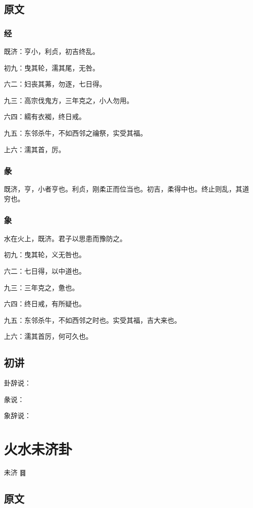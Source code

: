 \documentclass[12pt,oneside]{book}
\begin{document}
\section{原文}

\subsection{经}
既济：亨小，利贞，初吉终乱。

初九：曳其轮，濡其尾，无咎。

六二：妇丧其茀，勿逐，七日得。

九三：高宗伐鬼方，三年克之，小人勿用。

六四：繻有衣袽，终日戒。

九五：东邻杀牛，不如西邻之禴祭，实受其福。

上六：濡其首，厉。

\subsection{彖}
既济，亨，小者亨也。利贞，刚柔正而位当也。初吉，柔得中也。终止则乱，其道穷也。

\subsection{象}
水在火上，既济。君子以思患而豫防之。

初九：曳其轮，义无咎也。

六二：七日得，以中道也。

九三：三年克之，惫也。

六四：终日戒，有所疑也。

九五：东邻杀牛，不如西邻之时也。实受其福，吉大来也。

上六：濡其首厉，何可久也。

\section{初讲}
卦辞说：

彖说：

象辞说：

\chapter{火水未济卦}
未济 {\Large ䷿}
\section{原文}
\end{document}
